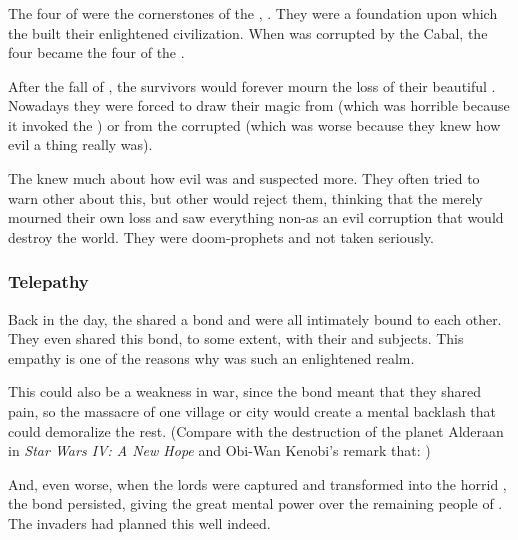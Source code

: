 \subsubsection{\Beacons}
The four \Beacons of \Kezerad were the cornerstones of the \Kezeradi \dweomer, . 
They were a foundation upon which the \Kezeradi built their enlightened civilization.
When \iquin was corrupted by the Cabal, the four \beacons became the four  of the \sephiroth. 

After the fall of \Kezerad, the survivors would forever mourn the loss of their beautiful \beacons. 
Nowadays they were forced to draw their magic from \itzach (which was horrible because it invoked the \banes) or from the corrupted \iquin (which was worse because they knew how evil a thing \iquin really was). 

The \Kezeradi knew much about how evil \iquin was and suspected more.
They often tried to warn other \resphain about this, but other \resphain would reject them, thinking that the \Kezeradi merely mourned their own loss and saw everything non-\Kezeradi as an evil corruption that would destroy the world.
They were doom-prophets and not taken seriously. 





\subsubsection{Telepathy}
Back in the day, the \Kezeradi{} shared a  bond and were all intimately bound to each other. They even shared this bond, to some extent, with their \human{} and \nephilic{} subjects. This empathy is one of the reasons why \Kezerad{} was such an enlightened realm. 

This could also be a weakness in war, since the bond meant that they shared pain, so the massacre of one \Kezeradi{} village or city would create a mental backlash that could demoralize the rest. (Compare with the destruction of the planet Alderaan in \emph{Star Wars IV: A New Hope} and Obi-Wan Kenobi's remark that: )

And, even worse, when the \Kezeradi{} lords were captured and transformed into the horrid \Sephiroth, the bond persisted, giving the \Sephiroth{} great mental power over the remaining people of \Kezerad. The invaders had planned this well indeed. 

